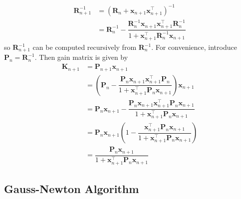 \documentclass[11pt]{report} %
\begin{document}
\begin{align}
\mathbf{R}_{n + 1}^{-1} &= \left(\mathbf{R}_{n} + \mathbf{x}_{n + 1}\mathbf{x}_{n + 1}^{\top}\right)^{-1} \\
&= \mathbf{R}_{n}^{-1} - \dfrac{\mathbf{R}_{n}^{-1}\mathbf{x}_{n + 1}\mathbf{x}_{n + 1}^{\top}\mathbf{R}_{n}^{-1}}{1 + \mathbf{x}_{n + 1}^{\top}\mathbf{R}_{n}^{-1}\mathbf{x}_{n + 1}}
\end{align}
so $\mathbf{R}_{n + 1}^{-1}$ can be computed recursively from $\mathbf{R}_{n}^{-1}$. For convenience, introduce $\mathbf{P}_{n} = \mathbf{R}_{n}^{-1}$. Then gain matrix is given by
\begin{align}
\mathbf{K}_{n + 1} &= \mathbf{P}_{n + 1}\mathbf{x}_{n + 1} \\
&= \left(\mathbf{P}_{n} - \dfrac{\mathbf{P}_{n}\mathbf{x}_{n + 1}\mathbf{x}_{n + 1}^{\top}\mathbf{P}_{n}}{1 + \mathbf{x}_{n + 1}^{\top}\mathbf{P}_{n}\mathbf{x}_{n + 1}}\right)\mathbf{x}_{n + 1} \\
&= \mathbf{P}_{n}\mathbf{x}_{n + 1} - \dfrac{\mathbf{P}_{n}\mathbf{x}_{n + 1}\mathbf{x}_{n + 1}^{\top}\mathbf{P}_{n}\mathbf{x}_{n + 1}}{1 + \mathbf{x}_{n + 1}^{\top}\mathbf{P}_{n}\mathbf{x}_{n + 1}} \\
&= \mathbf{P}_{n}\mathbf{x}_{n + 1}\left(1 - \dfrac{\mathbf{x}_{n + 1}^{\top}\mathbf{P}_{n}\mathbf{x}_{n + 1}}{1 + \mathbf{x}_{n + 1}^{\top}\mathbf{P}_{n}\mathbf{x}_{n + 1}}\right) \\
&=  \dfrac{\mathbf{P}_{n}\mathbf{x}_{n + 1}}{1 + \mathbf{x}_{n + 1}^{\top}\mathbf{P}_{n}\mathbf{x}_{n + 1}}
\end{align}

\subsection{Gauss-Newton Algorithm}
\end{document}

